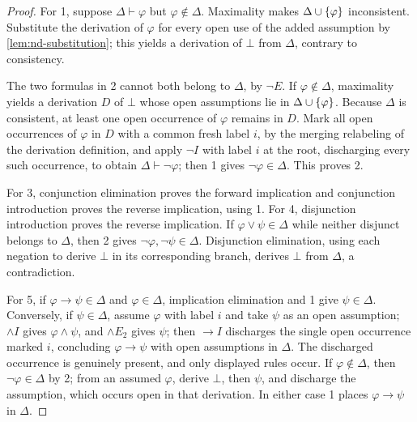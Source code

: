 \documentclass[11pt,oneside,openany]{book}
\theoremstyle{definition}
\theoremstyle{plain}
\theoremstyle{remark}
\DeclarePairedDelimiter{\set}{\lbrace}{\rbrace}
\newcommand{\derives}{\vdash}
\newcommand{\bottom}{\bot}
\begin{document}
\begin{proof}
For 1, suppose \(\Delta\derives\varphi\) but \(\varphi\notin\Delta\).
Maximality makes \(\Delta\cup\set{\varphi}\) inconsistent.  Substitute the
derivation of \(\varphi\) for every open use of the added assumption by
\cref{lem:nd-substitution}; this yields a derivation of \(\bottom\) from
\(\Delta\), contrary to consistency.

The two formulas in 2 cannot both belong to \(\Delta\), by \(\neg E\).  If
\(\varphi\notin\Delta\), maximality yields a derivation \(D\) of
\(\bottom\) whose open assumptions lie in \(\Delta\cup\set{\varphi}\).
Because \(\Delta\) is consistent, at least one open occurrence of
\(\varphi\) remains in \(D\).  Mark all open occurrences of \(\varphi\) in
\(D\) with a common fresh label \(i\), by the merging relabeling of the
derivation definition, and apply \(\neg I\) with label \(i\) at the root,
discharging every such occurrence, to obtain
\(\Delta\derives\neg\varphi\); then 1 gives \(\neg\varphi\in\Delta\).
This proves 2.

For 3, conjunction elimination proves the forward implication and conjunction
introduction proves the reverse implication, using 1.  For 4, disjunction
introduction proves the reverse implication.  If
\(\varphi\lor\psi\in\Delta\) while neither disjunct belongs to \(\Delta\),
then 2 gives \(\neg\varphi,\neg\psi\in\Delta\).  Disjunction elimination,
using each negation to derive \(\bottom\) in its corresponding branch, derives
\(\bottom\) from \(\Delta\), a contradiction.

For 5, if \(\varphi\to\psi\in\Delta\) and \(\varphi\in\Delta\), implication
elimination and 1 give \(\psi\in\Delta\).  Conversely, if
\(\psi\in\Delta\), assume \(\varphi\) with label \(i\) and take \(\psi\)
as an open assumption; \(\land I\) gives \(\varphi\land\psi\), and
\(\land E_2\) gives \(\psi\); then \(\to I\) discharges the single open
occurrence marked \(i\), concluding \(\varphi\to\psi\) with open
assumptions in \(\Delta\).  The discharged occurrence is genuinely
present, and only displayed rules occur.  If \(\varphi\notin\Delta\), then
\(\neg\varphi\in\Delta\) by 2; from an assumed \(\varphi\), derive
\(\bottom\), then \(\psi\), and discharge the assumption, which occurs
open in that derivation.  In either case 1
places \(\varphi\to\psi\) in \(\Delta\).
\end{proof}
\end{document}
